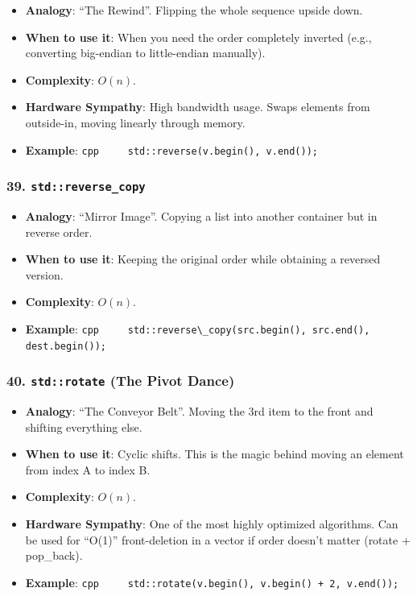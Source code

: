 \begin{itemize}
\tightlist
\item
  \textbf{Analogy}: ``The Rewind''. Flipping the whole sequence upside
  down.
\item
  \textbf{When to use it}: When you need the order completely inverted
  (e.g., converting big-endian to little-endian manually).
\item
  \textbf{Complexity}: \(O(n)\).
\item
  \textbf{Hardware Sympathy}: High bandwidth usage. Swaps elements from
  outside-in, moving linearly through memory.
\item
  \textbf{Example}:
  \passthrough{\lstinline!cpp     std::reverse(v.begin(), v.end());!}
\end{itemize}

\hypertarget{stdreverse_copy}{%
\subsubsection{\texorpdfstring{39.
\texttt{std::reverse\_copy}}{39. std::reverse\_copy}}\label{stdreverse_copy}}

\begin{itemize}
\tightlist
\item
  \textbf{Analogy}: ``Mirror Image''. Copying a list into another
  container but in reverse order.
\item
  \textbf{When to use it}: Keeping the original order while obtaining a
  reversed version.
\item
  \textbf{Complexity}: \(O(n)\).
\item
  \textbf{Example}:
  \passthrough{\lstinline!cpp     std::reverse\_copy(src.begin(), src.end(), dest.begin());!}
\end{itemize}

\hypertarget{stdrotate-the-pivot-dance}{%
\subsubsection{\texorpdfstring{40. \texttt{std::rotate} (The Pivot
Dance)}{40. std::rotate (The Pivot Dance)}}\label{stdrotate-the-pivot-dance}}

\begin{itemize}
\tightlist
\item
  \textbf{Analogy}: ``The Conveyor Belt''. Moving the 3rd item to the
  front and shifting everything else.
\item
  \textbf{When to use it}: Cyclic shifts. This is the magic behind
  moving an element from index A to index B.
\item
  \textbf{Complexity}: \(O(n)\).
\item
  \textbf{Hardware Sympathy}: One of the most highly optimized
  algorithms. Can be used for ``O(1)'' front-deletion in a vector if
  order doesn't matter (rotate + pop\_back).
\item
  \textbf{Example}:
  \passthrough{\lstinline!cpp     std::rotate(v.begin(), v.begin() + 2, v.end());!}
\end{itemize}

